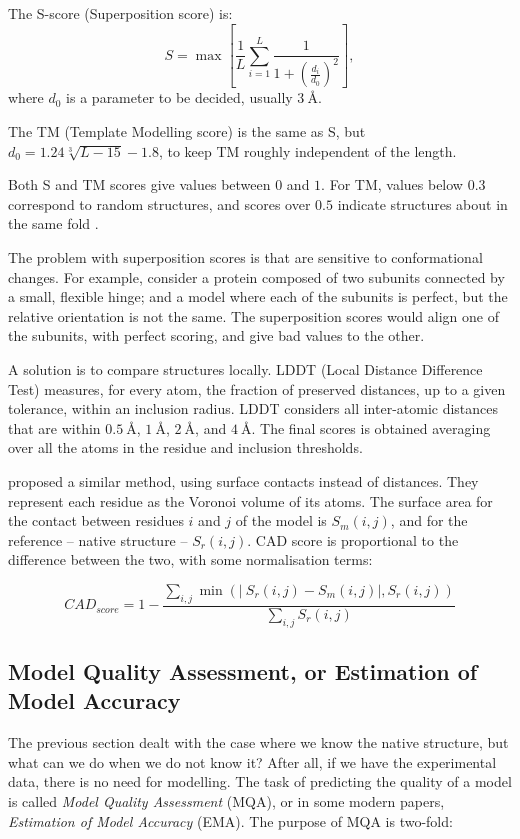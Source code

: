 The S-score (Superposition score) is:
\begin{equation*}
S = \max\left[\frac{1}{L} \sum_{i=1}^L \frac{1}{1 + \left(\frac{d_i}{d_0}\right)^2}\right],
\end{equation*}
where $d_0$ is a parameter to be decided, usually $\SI{3}{\angstrom}$.

The TM (Template Modelling score) is the same as S, but $d_0 = 1.24 \sqrt[3]{L - 15} - 1.8$, to keep TM roughly independent of the length.

Both S and TM scores give values between $0$ and $1$.
For TM, values below $0.3$ correspond to random structures, and scores over $0.5$ indicate structures about in the same fold \citep{tmscore05}.

The problem with superposition scores is that are sensitive to conformational changes.
For example, consider a protein composed of two subunits connected by a small, flexible hinge; and a model where each of the subunits is perfect, but the relative orientation is not the same.
The superposition scores would align one of the subunits, with perfect scoring, and give bad values to the other.

A solution is to compare structures locally. 
LDDT (Local Distance Difference Test) \citep{lddt} 
measures, for every atom, the fraction of preserved  distances, up to a given tolerance, within an inclusion radius.
LDDT considers all inter-atomic distances that are within $\SI{0.5}{\angstrom}$, $\SI{1}{\angstrom}$, $\SI{2}{\angstrom}$, and $\SI{4}{\angstrom}$.
The final scores is obtained averaging over all the atoms in the residue and inclusion thresholds.

\citet{cad} proposed a similar method, using surface contacts instead of distances. 
They represent each residue as the Voronoi volume of its atoms.
The surface area for the contact between residues $i$ and $j$ of the model is $S_m(i,j)$, and for the reference -- native structure -- $S_r(i,j)$.
CAD score is proportional to the difference between the two, with some normalisation terms:

\begin{equation*}
CAD_{score} = 1 - \frac{\sum_{i,j} \min\left( \left| \: S_{r}(i, j) - S_{m}(i, j)\right|, S_{r}(i, j)\right)}{\sum_{i,j} S_{r}(i, j)}
\end{equation*}

\subsection[Model Quality Assessment]{Model Quality Assessment, or Estimation of Model Accuracy}
The previous section dealt with the case where we know the native structure, but what can we do when we do not know it?
After all, if we have the experimental data, there is no need for modelling.
The task of predicting the quality of a model is called \emph{Model Quality Assessment} (MQA), or in some modern papers, \emph{Estimation of Model Accuracy} (EMA).
The purpose of MQA is two-fold:

